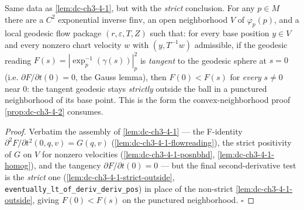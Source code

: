 \begin{lemma}
  \label{lem:dc-ch3-4-1-strict}
  \leanok
  Same data as \cref{lem:dc-ch3-4-1}, but with the \emph{strict} conclusion. For any
  $p\in M$ there are a $C^2$ exponential inverse $\mathrm{finv}$, an open neighborhood
  $V$ of $\varphi_p(p)$, and a local geodesic flow package $(r,\varepsilon,T,Z)$ such
  that: for every base position $y\in V$ and every nonzero chart velocity $w$ with
  $(y,T^{-1}w)$ admissible, if the geodesic reading $F(s)=|\exp_p^{-1}(\gamma(s))|_p^2$
  is \emph{tangent} to the geodesic sphere at $s=0$ (i.e. $\partial F/\partial t(0)=0$,
  the Gauss lemma), then $F(0)<F(s)$ for \emph{every} $s\neq0$ near $0$: the tangent
  geodesic stays \emph{strictly} outside the ball in a punctured neighborhood of its base
  point. This is the form the convex-neighborhood proof \cref{prop:dc-ch3-4-2} consumes.
\end{lemma}
\begin{proof}
  \leanok
  Verbatim the assembly of \cref{lem:dc-ch3-4-1} — the F-identity
  $\partial^2 F/\partial t^2(0,q,v)=G(q,v)$ (\cref{lem:dc-ch3-4-1-flowreading}), the strict
  positivity of $G$ on $V$ for nonzero velocities (\cref{lem:dc-ch3-4-1-posnbhd},
  \cref{lem:dc-ch3-4-1-homog}), and the tangency $\partial F/\partial t(0)=0$ — but the
  final second-derivative test is the \emph{strict} one (\cref{lem:dc-ch3-4-1-strict-outside},
  \texttt{eventually\_lt\_of\_deriv\_deriv\_pos}) in place of the non-strict
  \cref{lem:dc-ch3-4-1-outside}, giving $F(0)<F(s)$ on the punctured neighborhood. $\square$
\end{proof}

